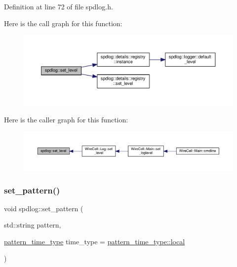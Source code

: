 Definition at line 72 of file spdlog.\+h.

Here is the call graph for this function\+:
\nopagebreak
\begin{figure}[H]
\begin{center}
\leavevmode
\includegraphics[width=350pt]{namespacespdlog_a9f952c6a1e1114b474aff89965261a1b_cgraph}
\end{center}
\end{figure}
Here is the caller graph for this function\+:
\nopagebreak
\begin{figure}[H]
\begin{center}
\leavevmode
\includegraphics[width=350pt]{namespacespdlog_a9f952c6a1e1114b474aff89965261a1b_icgraph}
\end{center}
\end{figure}
\mbox{\label{namespacespdlog_a638029f343e8dd2393d62288b1eb095e}} 
\subsubsection{\texorpdfstring{set\+\_\+pattern()}{set\_pattern()}}
{\footnotesize\ttfamily void spdlog\+::set\+\_\+pattern (\begin{DoxyParamCaption}\item[{std\+::string}]{pattern,  }\item[{\hyperlink{namespacespdlog_ad598fbd8338772e66ae09e8723a07ced}{pattern\+\_\+time\+\_\+type}}]{time\+\_\+type = {\ttfamily \hyperlink{namespacespdlog_ad598fbd8338772e66ae09e8723a07cedaf5ddaf0ca7929578b408c909429f68f2}{pattern\+\_\+time\+\_\+type\+::local}} }\end{DoxyParamCaption})\hspace{0.3cm}{\ttfamily [inline]}}



